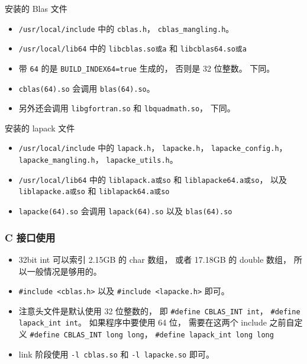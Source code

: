 安装的 Blas 文件
\begin{itemize}
\item \verb|/usr/local/include| 中的 \verb|cblas.h|， \verb|cblas_mangling.h|。
\item \verb|/usr/local/lib64| 中的 \verb|libcblas.so或a| 和 \verb|libcblas64.so或a|
\item 带 \verb|64| 的是 \verb|BUILD_INDEX64=true| 生成的， 否则是 32 位整数。 下同。
\item \verb|cblas(64).so| 会调用 \verb|blas(64).so|。
\item 另外还会调用 \verb|libgfortran.so| 和 \verb|lbquadmath.so|， 下同。
\end{itemize}

安装的 lapack 文件
\begin{itemize}
\item \verb|/usr/local/include| 中的 \verb|lapack.h|， \verb|lapacke.h|， \verb|lapacke_config.h|， \verb|lapacke_mangling.h|， \verb|lapacke_utils.h|。
\item \verb|/usr/local/lib64| 中的 \verb|liblapack.a或so| 和 \verb|liblapacke64.a或so|， 以及 \verb|liblapacke.a或so| 和 \verb|liblapack64.a或so|
\item \verb|lapacke(64).so| 会调用 \verb|lapack(64).so| 以及 \verb|blas(64).so|
\end{itemize}

\subsubsection{C 接口使用}
\begin{itemize}
\item 32bit int 可以索引 2.15GB 的 char 数组， 或者 17.18GB 的 double 数组， 所以一般情况是够用的。
\item \verb|#include <cblas.h>| 以及 \verb|#include <lapacke.h>| 即可。
\item 注意头文件是默认使用 32 位整数的， 即 \verb|#define CBLAS_INT int|， \verb|#define lapack_int int|。 如果程序中要使用 64 位， 需要在这两个 include 之前自定义 \verb|#define CBLAS_INT long long|， \verb|#define lapack_int long long|
\item link 阶段使用 \verb|-l cblas.so| 和 \verb|-l lapacke.so| 即可。
\end{itemize}
